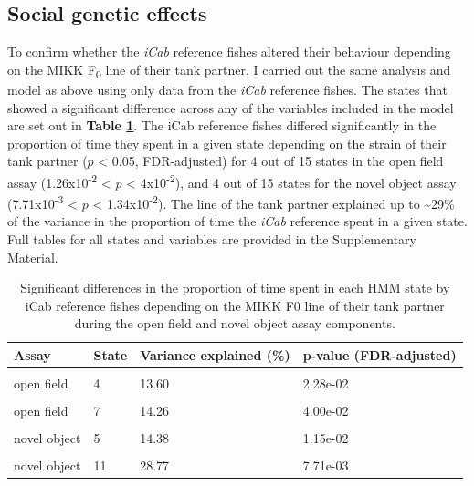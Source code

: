 \documentclass[
]{book}
\begin{document}
\hypertarget{social-genetic-effects-1}{%
\subsection{Social genetic effects}\label{social-genetic-effects-1}}

To confirm whether the \emph{\textcolor{iCab_424B4D}{iCab}} reference fishes altered their behaviour depending on the MIKK F\textsubscript{0} line of their tank partner, I carried out the same analysis and model as above using only data from the \emph{\textcolor{iCab_424B4D}{iCab}} reference fishes. The states that showed a significant difference across any of the variables included in the model are set out in \textbf{Table \ref{tab:mikk-sge-F0}}. The iCab reference fishes differed significantly in the proportion of time they spent in a given state depending on the strain of their tank partner (\(p\) \textless{} 0.05, FDR-adjusted) for 4 out of 15 states in the open field assay (1.26x10\textsuperscript{-2} \textless{} \(p\) \textless{} 4x10\textsuperscript{-2}), and 4 out of 15 states for the novel object assay (7.71x10\textsuperscript{-3} \textless{} \(p\) \textless{} 1.34x10\textsuperscript{-2}). The line of the tank partner explained up to \textasciitilde29\% of the variance in the proportion of time the \emph{\textcolor{iCab_424B4D}{iCab}} reference spent in a given state. Full tables for all states and variables are provided in the Supplementary Material.

\begin{table}

\caption{\label{tab:mikk-sge-F0}Significant differences in the proportion of time spent in each HMM state by iCab reference fishes depending on the MIKK F0 line of their tank partner during the open field and novel object assay components.}
\centering
\begin{tabular}[t]{llll}
\toprule
Assay & State & Variance explained (\%) & p-value (FDR-adjusted)\\
\midrule
\cellcolor{gray!6}{open field} & \cellcolor{gray!6}{3} & \cellcolor{gray!6}{14.93} & \cellcolor{gray!6}{2.10e-02}\\
open field & 4 & 13.60 & 2.28e-02\\
\cellcolor{gray!6}{open field} & \cellcolor{gray!6}{5} & \cellcolor{gray!6}{15.33} & \cellcolor{gray!6}{1.26e-02}\\
open field & 7 & 14.26 & 4.00e-02\\
\cellcolor{gray!6}{novel object} & \cellcolor{gray!6}{4} & \cellcolor{gray!6}{14.33} & \cellcolor{gray!6}{1.23e-02}\\
\addlinespace
novel object & 5 & 14.38 & 1.15e-02\\
\cellcolor{gray!6}{novel object} & \cellcolor{gray!6}{9} & \cellcolor{gray!6}{24.61} & \cellcolor{gray!6}{1.34e-02}\\
novel object & 11 & 28.77 & 7.71e-03\\
\bottomrule
\end{tabular}
\end{table}
\end{document}
